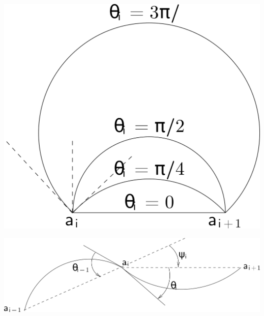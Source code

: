 \clearpage
\hfil\includegraphics[width=.5\textwidth]{../Graphics/453a.png}\hfil

\clearpage
\hfil\includegraphics[width=.5\textwidth]{../Graphics/453b.png}\hfil


